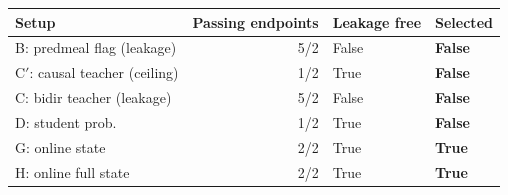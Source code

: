 \begin{tabular}{lrll}
\toprule
Setup & Passing endpoints & Leakage free & Selected \\
\midrule
B: predmeal flag (leakage) & 5/2 & False & \textbf{False} \\
C$'$: causal teacher (ceiling) & 1/2 & True & \textbf{False} \\
C: bidir teacher (leakage) & 5/2 & False & \textbf{False} \\
D: student prob. & 1/2 & True & \textbf{False} \\
G: online state & 2/2 & True & \textbf{True} \\
H: online full state & 2/2 & True & \textbf{True} \\
\bottomrule
\end{tabular}
